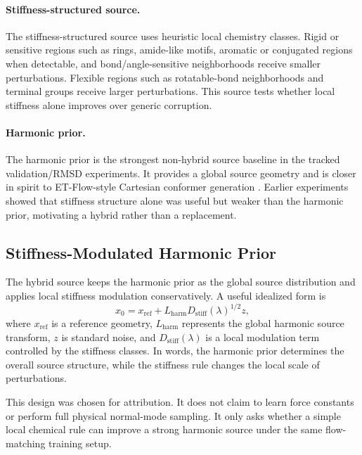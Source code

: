 \documentclass[11pt]{article}
\begin{document}
\paragraph{Stiffness-structured source.}
The stiffness-structured source uses heuristic local chemistry classes. Rigid or sensitive regions such as rings, amide-like motifs, aromatic or conjugated regions when detectable, and bond/angle-sensitive neighborhoods receive smaller perturbations. Flexible regions such as rotatable-bond neighborhoods and terminal groups receive larger perturbations. This source tests whether local stiffness alone improves over generic corruption.

\paragraph{Harmonic prior.}
The harmonic prior is the strongest non-hybrid source baseline in the tracked validation/RMSD experiments. It provides a global source geometry and is closer in spirit to ET-Flow-style Cartesian conformer generation \cite{etflow}. Earlier experiments showed that stiffness structure alone was useful but weaker than the harmonic prior, motivating a hybrid rather than a replacement.

\subsection{Stiffness-Modulated Harmonic Prior}

The hybrid source keeps the harmonic prior as the global source distribution and applies local stiffness modulation conservatively. A useful idealized form is
\begin{equation}
    x_0 = x_{\mathrm{ref}} + L_{\mathrm{harm}} D_{\mathrm{stiff}}(\lambda)^{1/2} z,
    \label{eq:hybrid-source}
\end{equation}
where $x_{\mathrm{ref}}$ is a reference geometry, $L_{\mathrm{harm}}$ represents the global harmonic source transform, $z$ is standard noise, and $D_{\mathrm{stiff}}(\lambda)$ is a local modulation term controlled by the stiffness classes. In words, the harmonic prior determines the overall source structure, while the stiffness rule changes the local scale of perturbations.

This design was chosen for attribution. It does not claim to learn force constants or perform full physical normal-mode sampling. It only asks whether a simple local chemical rule can improve a strong harmonic source under the same flow-matching training setup.
\end{document}
